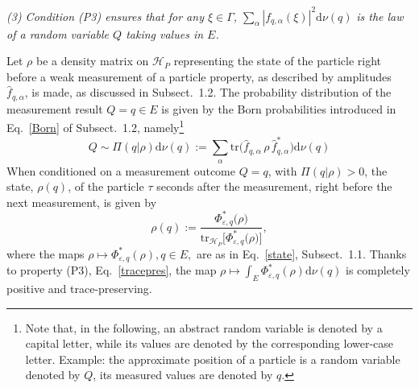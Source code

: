 \documentclass[11pt]{article}
\begin{document}
\textit{(3) Condition (P3) ensures that for any $\xi\in \Gamma$, }$\sum_{\alpha}|f_{q,\alpha}(\xi)|^2\text{d}\nu(q)$
\textit{ is the law of a random variable $Q$ taking values in $E$.}

Let $\rho$ be a density matrix on $\mathcal{H}_P$ representing the state of the particle right before a weak 
measurement of a particle property, as described by amplitudes $\widehat{f}_{q,\alpha}$, is made, as discussed 
in Subsect.~1.2. The probability distribution of the measurement result $Q=q\in E$ is given 
by the Born probabilities introduced in Eq.~\eqref{Born} of Subsect.~1.2, namely\footnote{Note that, in the following, an abstract random variable is denoted by a capital letter, while its values are denoted by the corresponding lower-case letter. Example: the approximate position of a particle is a random variable denoted by $Q$, its measured values are denoted by $q$.}
$$ Q \sim \Pi(q \vert \rho)\text{d}\nu(q):=\sum_{\alpha}\text{tr}\big(\widehat{f}_{q, \alpha}\,\rho\, \widehat{f}_{q, \alpha}^{*}\big)\text{d}\nu(q)$$
When conditioned on a measurement outcome $Q=q$, with $\Pi(q\vert \rho) >0$, the state, $\rho(q)$, of the particle 
$\tau$ seconds after the measurement, right before the next measurement, is given by
\begin{equation}\label{q-state}
\rho(q):= \frac{\Phi_{\varepsilon, q}^{*}\big(\rho\big)}{\text{tr}_{\mathcal{H}_P}\big[\Phi_{\varepsilon, q}^{*}(\rho\big)\big] },
\end{equation}
where the maps $\rho \mapsto \Phi_{\varepsilon, q}^{*}(\rho), q\in E,$ are as in Eq.~\eqref{state}, Subsect.~1.1.
Thanks to property (P3), Eq.~\eqref{tracepres}, the map $\rho \mapsto \int_{E} \Phi_{\varepsilon, q}^{*}(\rho) \text{d}\nu(q)$ 
is completely positive and trace-preserving.
\end{document}
